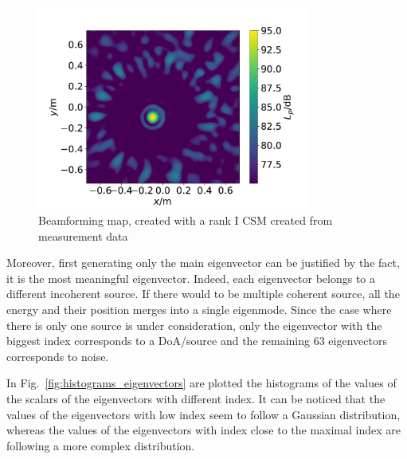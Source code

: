 \documentclass[11pt,a4paper,twoside]{report}
\begin{document}
\begin{figure}
    \centering
    \includegraphics[width=0.8\textwidth]{figs/measurement_sample_rank_I_beamforming.pdf}
    \caption{Beamforming map, created with a rank I CSM created from measurement data}
    \label{fig:measurement_sample_rank_I_beamforming}
\end{figure}



Moreover, first generating only the main eigenvector can be justified by the fact, it is the most meaningful eigenvector. Indeed, each eigenvector belongs to a different incoherent source. If there would to be  multiple coherent source, all the energy and their position merges into a single eigenmode. Since the case where there is only one source is under consideration, only the eigenvector with the biggest index corresponds to a DoA/source and the remaining 63 eigenvectors corresponds to noise.  

In Fig.~\ref{fig:histograms_eigenvectors} are plotted the histograms of the values of the scalars of the eigenvectors with different index. It can be noticed that the values of the eigenvectors with low index seem to follow a Gaussian distribution, whereas the values of the eigenvectors with index close to the maximal index are following a more complex distribution.
\end{document}
